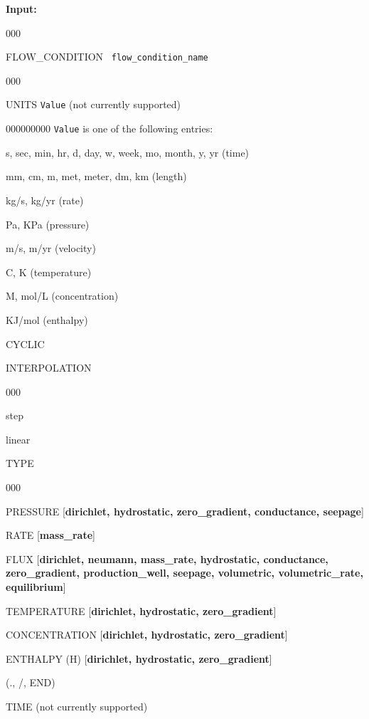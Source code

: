 \documentclass[12pt]{article}
\begin{document}
{\noindent\bf Input:}
\begin{deflist}{000}
\item [FLOW\_CONDITION] \ {\tt flow\_condition\_name}
\begin{deflist}{000}
\item [UNITS] {\tt Value} (not currently supported)
\begin{deflist}{000000000}
{\tt Value} is one of the following entries:
\item[s, sec, min, hr, d, day, w, week, mo, month, y, yr] (time)
\item[mm, cm, m, met, meter, dm, km] (length)
\item[kg/s, kg/yr] (rate)
\item[Pa, KPa] (pressure)
\item[m/s, m/yr] (velocity)
\item[C, K] (temperature)
\item[M, mol/L] (concentration)
\item[KJ/mol] (enthalpy)
\end{deflist}


\item[CYCLIC] 

\item[INTERPOLATION] ~
\begin{deflist}{000}
\item[step]
\item[linear]
\end{deflist}

\item[TYPE] ~

\begin{deflist}{000}
\item[PRESSURE] [{\bf dirichlet, hydrostatic, zero\_gradient, conductance, seepage}]
\item[RATE] [{\bf mass\_rate}]
\item[FLUX] [{\bf dirichlet, neumann, mass\_rate, hydrostatic, conductance, zero\_gradient, production\_well, seepage, volumetric, volumetric\_rate, equilibrium}]
\item[TEMPERATURE] [{\bf dirichlet, hydrostatic, zero\_gradient}]
\item[CONCENTRATION] [{\bf dirichlet, hydrostatic, zero\_gradient}]
\item[ENTHALPY (H)] [{\bf dirichlet, hydrostatic, zero\_gradient}]
\end{deflist}
\item[(., /, END)]
\item[TIME] (not currently supported)


\end{deflist}
\end{deflist}
\end{document}
